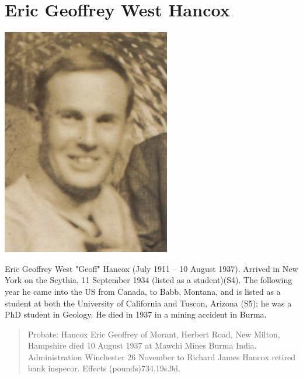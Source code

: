 \section{Eric Geoffrey West Hancox}\label{Eric_Geoffrey_West_Hancox}

\begin{center}
\includegraphics[width=0.8\linewidth]{photos/Eric_Geoffrey_West_Hancox}
\end{center}

Eric Geoffrey West "Geoff" Hancox (July 1911 -- 10 August 1937). Arrived in New York on the Scythia, 11 September 1934 (listed as a student)(S4). The following year he came into the US from Canada, to Babb, Montana, and is listed as a student at both the University of California and Tuscon, Arizona (S5); he was a PhD student in Geology. He died in 1937 in a mining accident in Burma.

\begin{quotation}
Probate: Hancox Eric Geoffrey of Morant, Herbert Road, New Milton, Hampshire died 10 August 1937 at Mawchi Mines Burma India. Administration Winchester 26 November to Richard James Hancox retired bank inspecor. Effects (pounds)734.19s.9d.
\end{quotation}

